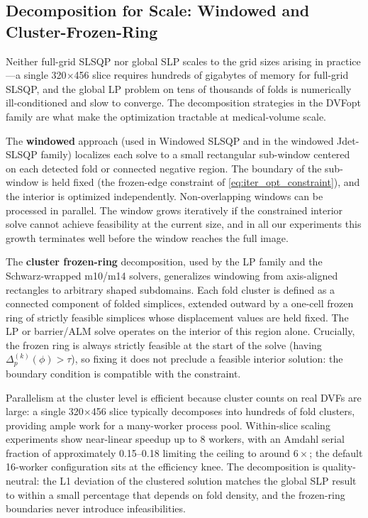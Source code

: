 \documentclass[lettersize,journal]{IEEEtran}
\begin{document}
\subsection{Decomposition for Scale: Windowed and Cluster-Frozen-Ring}
\label{sec:decomposition}

Neither full-grid SLSQP nor global SLP scales to the grid sizes arising in practice—a single 320$\times$456 slice requires hundreds of gigabytes of memory for full-grid SLSQP, and the global LP problem on tens of thousands of folds is numerically ill-conditioned and slow to converge. The decomposition strategies in the DVFopt family are what make the optimization tractable at medical-volume scale.

The \textbf{windowed} approach (used in Windowed SLSQP and in the windowed Jdet-SLSQP family) localizes each solve to a small rectangular sub-window centered on each detected fold or connected negative region. The boundary of the sub-window is held fixed (the frozen-edge constraint of \autoref{eq:iter_opt_constraint}), and the interior is optimized independently. Non-overlapping windows can be processed in parallel. The window grows iteratively if the constrained interior solve cannot achieve feasibility at the current size, and in all our experiments this growth terminates well before the window reaches the full image.

The \textbf{cluster frozen-ring} decomposition, used by the LP family and the Schwarz-wrapped m10/m14 solvers, generalizes windowing from axis-aligned rectangles to arbitrary shaped subdomains. Each fold cluster is defined as a connected component of folded simplices, extended outward by a one-cell frozen ring of strictly feasible simplices whose displacement values are held fixed. The LP or barrier/ALM solve operates on the interior of this region alone. Crucially, the frozen ring is always strictly feasible at the start of the solve (having $\Delta^{(k)}_p(\phi) > \tau$), so fixing it does not preclude a feasible interior solution: the boundary condition is compatible with the constraint.

Parallelism at the cluster level is efficient because cluster counts on real DVFs are large: a single 320$\times$456 slice typically decomposes into hundreds of fold clusters, providing ample work for a many-worker process pool. Within-slice scaling experiments show near-linear speedup up to 8 workers, with an Amdahl serial fraction of approximately 0.15--0.18 limiting the ceiling to around $6\times$; the default 16-worker configuration sits at the efficiency knee. The decomposition is quality-neutral: the L1 deviation of the clustered solution matches the global SLP result to within a small percentage that depends on fold density, and the frozen-ring boundaries never introduce infeasibilities.
\end{document}
